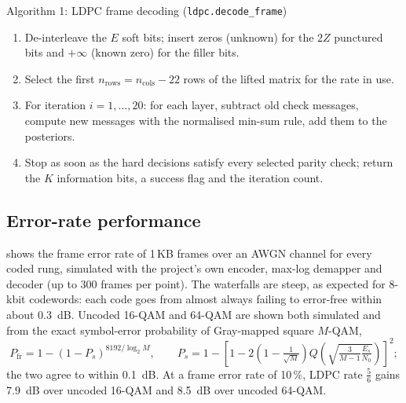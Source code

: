 \documentclass[11pt,a4paper,oneside]{report}
\newcommand{\code}[1]{\texttt{\small #1}}
\begin{document}
\begin{algobox}{Algorithm 1: LDPC frame decoding (\code{ldpc.decode\_frame})}
\small
\begin{enumerate}[leftmargin=*,label=\arabic*.]
  \item De-interleave the $E$ soft bits; insert zeros (unknown) for the $2Z$ punctured bits and
        $+\infty$ (known zero) for the filler bits.
  \item Select the first $n_\text{rows}=n_\text{cols}-22$ rows of the lifted matrix for the rate in use.
  \item For iteration $i=1,\ldots,20$: for each layer, subtract old check messages, compute new
        messages with the normalised min-sum rule, add them to the posteriors.
  \item Stop as soon as the hard decisions satisfy every selected parity check; return the $K$
        information bits, a success flag and the iteration count.
\end{enumerate}
\end{algobox}

\subsection{Error-rate performance}
 shows the frame error rate of 1\,KB frames over an AWGN channel for every coded rung,
simulated with the project's own encoder, max-log demapper and decoder (up to 300 frames per point).
The waterfalls are steep, as expected for 8-kbit codewords: each code goes from almost always failing
to error-free within about \SI{0.3}{dB}. Uncoded 16-QAM and 64-QAM are shown both simulated and from
the exact symbol-error probability of Gray-mapped square $M$-QAM,
\begin{equation}
  P_\text{fr}=1-\left(1-P_s\right)^{8192/\log_2 M},\qquad
  P_s=1-\left[1-2\left(1-\tfrac{1}{\sqrt M}\right)Q\!\left(\sqrt{\tfrac{3}{M-1}\tfrac{E_s}{N_0}}\right)\right]^2 ;
\end{equation}
the two agree to within \SI{0.1}{dB}. At a frame error rate of 10\,\%, LDPC rate $\tfrac56$ gains
\SI{7.9}{dB} over uncoded 16-QAM and \SI{8.5}{dB} over uncoded 64-QAM.
\end{document}
